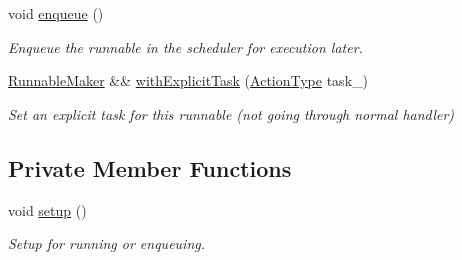 \begin{DoxyCompactItemize}
void \hyperlink{structvt_1_1runnable_1_1_runnable_maker_a76516d824c744bdd347806012a78e19b}{enqueue} ()
\begin{DoxyCompactList}\small\item\em Enqueue the runnable in the scheduler for execution later. \end{DoxyCompactList}\item 
\hyperlink{structvt_1_1runnable_1_1_runnable_maker}{Runnable\+Maker} \&\& \hyperlink{structvt_1_1runnable_1_1_runnable_maker_abe4aca5620c53dc9e035c3a60fe8c76b}{with\+Explicit\+Task} (\hyperlink{namespacevt_ae0a5a7b18cc99d7b732cb4d44f46b0f3}{Action\+Type} task\+\_\+)
\begin{DoxyCompactList}\small\item\em Set an explicit task for this runnable (not going through normal handler) \end{DoxyCompactList}\end{DoxyCompactItemize}
\subsection*{Private Member Functions}
\begin{DoxyCompactItemize}
\item 
void \hyperlink{structvt_1_1runnable_1_1_runnable_maker_add114dad8a3f0769bed8b8396ba9a13a}{setup} ()
\begin{DoxyCompactList}\small\item\em Setup for running or enqueuing. \end{DoxyCompactList}\end{DoxyCompactItemize}
